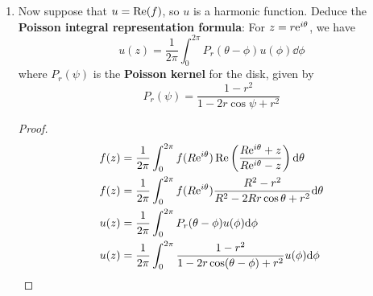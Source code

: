 \documentclass[../psets.tex]{subfiles}
\begin{document}
\begin{enumerate}[ref={A.\arabic*}]
\begin{enumerate}
        \item Now suppose that $u=\re(f)$, so $u$ is a harmonic function. Deduce the \textbf{Poisson integral representation formula}: For $z=r\e[i\theta]$, we have
        \begin{equation*}
            u(z) = \frac{1}{2\pi}\int_0^{2\pi}P_r(\theta-\phi)u(\phi)\dd\phi
        \end{equation*}
        where $P_r(\psi)$ is the \textbf{Poisson kernel} for the disk, given by
        \begin{equation*}
            P_r(\psi) = \frac{1-r^2}{1-2r\cos\psi+r^2}
        \end{equation*}
        \begin{proof}
            \begin{align*}
                f(z) &= \frac{1}{2\pi}\int_0^{2\pi}f(R\e[i\theta])\re\left( \frac{R\e[i\theta]+z}{R\e[i\theta]-z} \right)\dd\theta\\
                f(z) &= \frac{1}{2\pi}\int_0^{2\pi}f(R\e[i\theta])\frac{R^2-r^2}{R^2-2Rr\cos\theta+r^2}\dd\theta\\
                u(z) &= \frac{1}{2\pi}\int_0^{2\pi}P_r(\theta-\phi)u(\phi)\dd\phi\\
                u(z) &= \frac{1}{2\pi}\int_0^{2\pi}\frac{1-r^2}{1-2r\cos(\theta-\phi)+r^2}u(\phi)\dd\phi
            \end{align*}
        \end{proof}
    \end{enumerate}
\end{enumerate}
\end{document}
